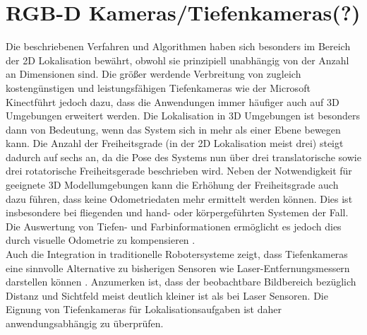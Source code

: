 \section{RGB-D Kameras/Tiefenkameras(?)}
Die beschriebenen Verfahren und Algorithmen haben sich besonders im Bereich der 2D Lokalisation bewährt, obwohl sie prinzipiell unabhängig von der Anzahl an Dimensionen sind. Die größer werdende Verbreitung von zugleich kostengünstigen und leistungsfähigen Tiefenkameras wie der Microsoft Kinect\red[Tm] führt jedoch dazu, dass die Anwendungen immer häufiger auch auf 3D Umgebungen erweitert werden. Die Lokalisation in 3D Umgebungen ist besonders dann von Bedeutung, wenn das System sich in mehr als einer Ebene bewegen kann. Die Anzahl der Freiheitsgrade (in der 2D Lokalisation meist drei) steigt dadurch auf sechs an, da die Pose des Systems nun über drei translatorische sowie drei rotatorische Freiheitsgerade beschrieben wird. Neben der Notwendigkeit für geeignete 3D Modellumgebungen kann die Erhöhung der Freiheitsgrade auch dazu führen, dass keine Odometriedaten mehr ermittelt werden können. Dies ist insbesondere bei fliegenden \cite{Huang2011} und hand- oder körpergeführten Systemen \cite{Fallon2012} der Fall. Die Auswertung von Tiefen- und Farbinformationen ermöglicht es jedoch dies durch visuelle Odometrie zu kompensieren \cite{Whelan2013robust}.\\
Auch die Integration in traditionelle Robotersysteme zeigt, dass Tiefenkameras eine sinnvolle Alternative zu bisherigen Sensoren wie Laser-Entfernungsmessern darstellen können \cite{Cunha2011} \cite{Eriksson2012}. Anzumerken ist, dass der beobachtbare Bildbereich bezüglich Distanz und Sichtfeld meist deutlich kleiner ist als bei Laser Sensoren. Die Eignung von Tiefenkameras für Lokalisationsaufgaben ist daher anwendungsabhängig zu überprüfen.\\


